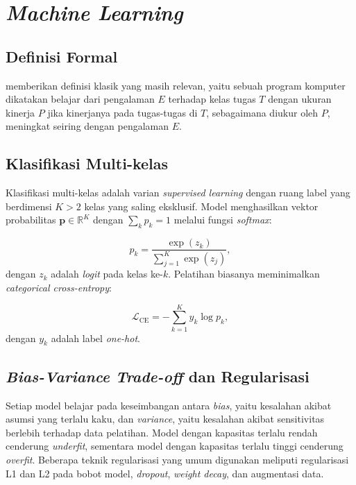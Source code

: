 \section{\textit{Machine Learning}}
\label{sec:ml}

\subsection{Definisi Formal}

\citet{mitchellMachineLearning1997} memberikan definisi klasik yang masih relevan, yaitu sebuah program komputer dikatakan belajar dari pengalaman $E$ terhadap kelas tugas $T$ dengan ukuran kinerja $P$ jika kinerjanya pada tugas-tugas di $T$, sebagaimana diukur oleh $P$, meningkat seiring dengan pengalaman $E$.

\subsection{Klasifikasi Multi-kelas}

Klasifikasi multi-kelas adalah varian \textit{supervised learning} dengan ruang label yang berdimensi $K > 2$ kelas yang saling eksklusif. Model menghasilkan vektor probabilitas $\mathbf{p} \in \mathbb{R}^K$ dengan $\sum_k p_k = 1$ melalui fungsi \textit{softmax}:

\begin{equation}
    p_k = \frac{\exp(z_k)}{\sum_{j=1}^{K} \exp(z_j)},
    \label{eq:softmax}
\end{equation}
dengan $z_k$ adalah \textit{logit} pada kelas ke-$k$. Pelatihan biasanya meminimalkan \textit{categorical cross-entropy}:

\begin{equation}
    \mathcal{L}_{\text{CE}} = - \sum_{k=1}^{K} y_k \log p_k,
    \label{eq:crossentropy}
\end{equation}
dengan $y_k$ adalah label \textit{one-hot}.

\subsection{\textit{Bias-Variance Trade-off} dan Regularisasi}

Setiap model belajar pada keseimbangan antara \textit{bias}, yaitu kesalahan akibat asumsi yang terlalu kaku, dan \textit{variance}, yaitu kesalahan akibat sensitivitas berlebih terhadap data pelatihan. Model dengan kapasitas terlalu rendah cenderung \textit{underfit}, sementara model dengan kapasitas terlalu tinggi cenderung \textit{overfit}. Beberapa teknik regularisasi yang umum digunakan meliputi regularisasi L1 dan L2 pada bobot model, \textit{dropout}, \textit{weight decay}, dan augmentasi data.

